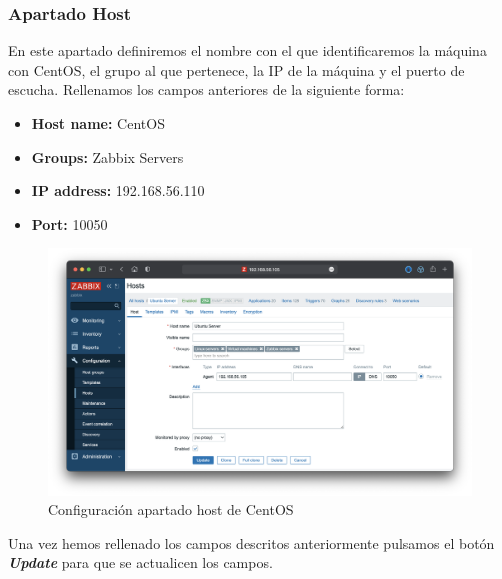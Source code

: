 \subsubsection{Apartado Host}
En este apartado definiremos el nombre con el que identificaremos la máquina con CentOS, el grupo al que pertenece, la IP de la máquina y el puerto de escucha. Rellenamos los campos
anteriores de la siguiente forma:
    \begin{itemize}
        \item \textbf{Host name:} CentOS
        \item \textbf{Groups:} Zabbix Servers
        \item \textbf{IP address:} 192.168.56.110
        \item \textbf{Port:} 10050
    \end{itemize}
    \begin{figure}[H]
        \centering
        \includegraphics[scale=0.35]{images/centos_conf.png}
        \caption{Configuración apartado host de CentOS}
        \label{fig:centos_conf}
    \end{figure}
Una vez hemos rellenado los campos descritos anteriormente pulsamos el botón \textbf{\emph{Update}} para que se actualicen los campos.

